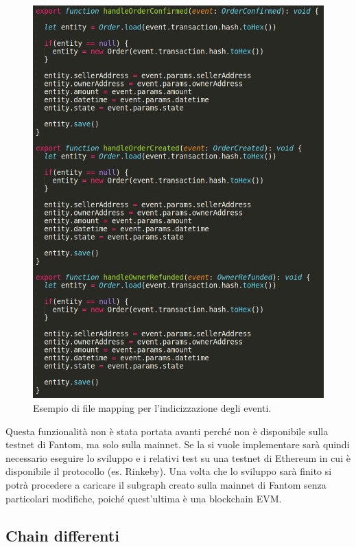 \begin{itemize}
 \begin{figure}[H]
    \centering
    \includegraphics[scale=0.3]{immagini/map.png}
    \caption{Esempio di file mapping per l'indicizzazione degli eventi.}
 \end{figure}

\end{itemize}

Questa funzionalità non è stata portata avanti perché non è disponibile sulla testnet di Fantom, ma solo sulla mainnet. Se la si vuole implementare sarà quindi necessario eseguire lo sviluppo e i relativi test su una testnet di Ethereum in cui è disponibile il protocollo (es. Rinkeby\glo). Una volta che lo sviluppo sarà finito si potrà procedere a caricare il subgraph creato sulla mainnet di Fantom senza particolari modifiche, poiché quest'ultima è una blockchain EVM.


\subsection{Chain differenti}

